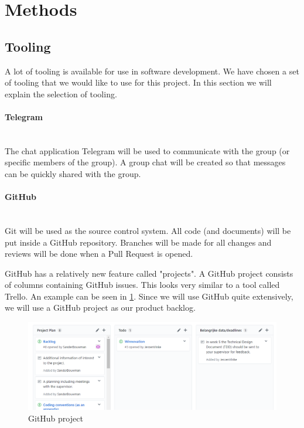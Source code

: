 \section{Methods}

\subsection{Tooling}
A lot of tooling is available for use in software development. We have chosen a set of tooling that we would like to use for this project. In this section we will explain the selection of tooling.

\paragraph{Telegram}
~\\ The chat application Telegram will be used to communicate with the group (or specific members of the group). A group chat will be created so that messages can be quickly shared with the group.

\paragraph{GitHub}
~\\ Git will be used as the source control system. All code (and documents) will be put inside a GitHub repository. Branches will be made for all changes and reviews will be done when a Pull Request is opened.

GitHub has a relatively new feature called "projects". A GitHub project consists of columns containing GitHub issues. This looks very similar to a tool called Trello. An example can be seen in \cref{fig:githubproject}. Since we will use GitHub quite extensively, we will use a GitHub project as our product backlog.

\begin{figure}
    \centering
    \includegraphics[scale=0.75]{images/github-projects.PNG}
    \caption{GitHub project}\label{fig:githubproject}
\end{figure}

